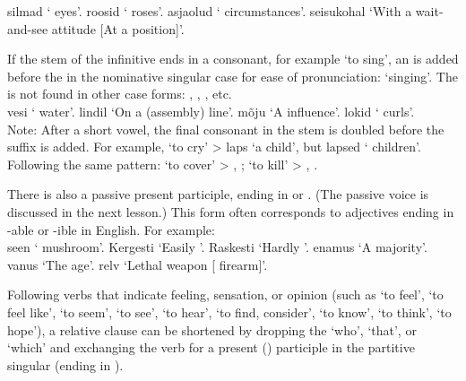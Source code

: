  silmad ` eyes'.  roosid ` roses'.  asjaolud ` circumstances'.  seisukohal `With a wait-and-see attitude [\lit At a  position]'.

\newSection If the stem of the  infinitive ends in a consonant, for example  `to sing', an  is added before the  in the nominative singular case for ease of pronunciation:  `singing'. The  is not found in other case forms: \gen \sing {}, \parti \sing {}, \ill \sing {}, etc. \\

 vesi ` water'.  lindil `On a  (assembly) line'.  mõju `A  influence'.  lokid ` curls'. \\

Note: After a short vowel, the final consonant in the stem is doubled before the  suffix is added. For example,  `to cry' >  laps `a  child', but  lapsed ` children'. Following the same pattern:  `to cover' > , ;  `to kill' > , .

\newSection There is also a passive present participle, ending in  or . (The passive voice is discussed in the next lesson.) This form often corresponds to adjectives ending in -able or -ible in English. For example: \\

 seen ` mushroom'. Kergesti  `Easily '. Raskesti  `Hardly '.  enamus `A  majority'.  vanus `The  age'.  relv `Lethal weapon [ firearm]'.


\newSection Following verbs that indicate feeling, sensation, or opinion (such as  `to feel',  `to feel like',  `to seem',  `to see',  `to hear',  `to find, consider',  `to know',  `to think',  `to hope'), a relative clause can be shortened by dropping the `who', `that', or `which' and exchanging the verb for a present () participle in the partitive singular (ending in ). \\

